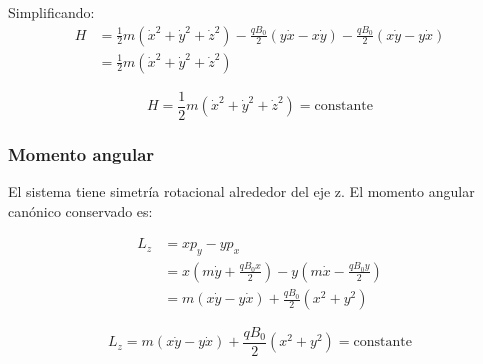 \documentclass{article}
\begin{document}
Simplificando:
\begin{align}
H &= \frac{1}{2}m(\dot{x}^2 + \dot{y}^2 + \dot{z}^2) - \frac{qB_0}{2}(y\dot{x} - x\dot{y}) - \frac{qB_0}{2}(x\dot{y} - y\dot{x}) \\
&= \frac{1}{2}m(\dot{x}^2 + \dot{y}^2 + \dot{z}^2)
\end{align}

\begin{equation}
\boxed{H = \frac{1}{2}m(\dot{x}^2 + \dot{y}^2 + \dot{z}^2) = \text{constante}}
\end{equation}

\subsubsection*{Momento angular}

El sistema tiene simetría rotacional alrededor del eje z. El momento angular canónico conservado es:

\begin{align}
L_z &= x p_y - y p_x \\
&= x\left(m\dot{y} + \frac{qB_0 x}{2}\right) - y\left(m\dot{x} - \frac{qB_0 y}{2}\right) \\
&= m(x\dot{y} - y\dot{x}) + \frac{qB_0}{2}(x^2 + y^2)
\end{align}

\begin{equation}
\boxed{L_z = m(x\dot{y} - y\dot{x}) + \frac{qB_0}{2}(x^2 + y^2) = \text{constante}}
\end{equation}







%
%
%
%
%
%
%
\end{document}

